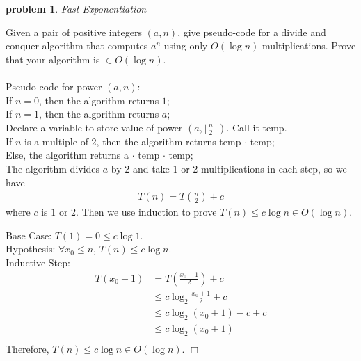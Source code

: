 \documentclass[10pt]{article}
\newenvironment{proof}{\par\noindent{\it Proof.}\hspace*{1em}}{$\Box$\bigskip}
\newtheorem{problem}{\sc\color{cit}problem}
\begin{document}
\vspace*{.25in} %

\begin{problem} Fast Exponentiation \end{problem}
Given a pair of positive integers $(a,n)$, give pseudo-code for a divide and conquer algorithm that computes $a^n$ using only $O(\log n)$ multiplications.  Prove that your algorithm is $\in O(\log n)$.\\
\\
Pseudo-code for power $(a, n)$:\\
If $n=0$, then the algorithm returns $1$;\\
If $n=1$, then the algorithm returns $a$;\\
Declare a variable to store value of power $(a, \lfloor \frac{n}{2} \rfloor)$. Call it temp.\\
If $n$ is a multiple of $2$, then the algorithm returns temp $\cdot$ temp;\\
Else, the algorithm returns a $\cdot$ temp $\cdot$ temp;\\
The algorithm divides $a$ by $2$ and take $1$ or $2$ multiplications in each step, so we have 
\begin{align}
    T(n)=T(\frac{n}{2})+ c 
\end{align}
where $c$ is $1$ or $2$. Then we use induction to prove $T(n) \leq c\log n\in O(\log n)$.
\begin{proof}
Base Case: $T(1)=0\leq c \log 1$.\\
Hypothesis: $\forall x_0 \leq n$, $T(n) \leq c\log n$.\\
Inductive Step: 
\begin{align}
    T(x_0+1)&=T(\frac{x_0+1}{2})+c\\
            &\leq c \log_2 {\frac{x_0+1}{2}}+c\\
            &\leq c \log_2 (x_0+1) -c + c\\
            &\leq c \log_2 (x_0+1)\\
\end{align}
Therefore, $T(n) \leq c\log n \in O(\log n)$.
\end{proof}

 \newpage
\end{document}
